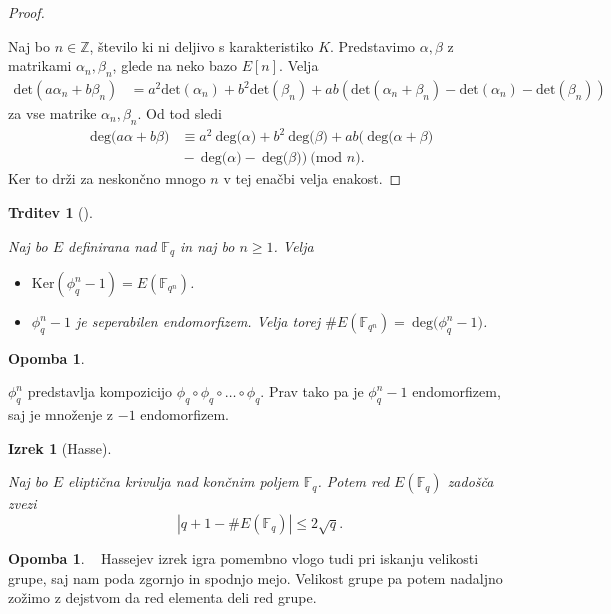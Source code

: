 \documentclass[12pt,a4paper,twoside]{article}
\theoremstyle{definition} %
\newtheorem{opomba}[definicija]{Opomba}
\theoremstyle{plain} %
\newtheorem{izrek}[definicija]{Izrek}
\newtheorem{trditev}[definicija]{Trditev}
\numberwithin{equation}{section}  %
\newcommand{\Z}{\mathbb Z}
\newcommand{\F}{\mathbb F}
\newcommand{\E}[1]{E({#1})}
\newcommand{\MOD}[1]{\ \text{(mod }{#1}\text{)}}
\newcommand{\DEG}[1]{\ \text{deg(}{#1}\text{)}}
\begin{document}
\begin{proof}~

Naj bo $n \in \Z$, število ki ni deljivo s karakteristiko $K$. Predstavimo $\alpha,\beta$ z matrikami $\alpha_n,\beta_n$, glede na neko bazo $E[n]$.
Velja
\begin{align}
\text{det}(a\alpha_n+b\beta_n) &{}=  a^2\text{det}(\alpha_n)+b^2\text{det}(\beta_n) + ab(\text{det}(\alpha_n+\beta_n)-\text{det}(\alpha_n)-\text{det}(\beta_n)) \nonumber
\end{align}
za vse matrike $\alpha_n,\beta_n$.
Od tod sledi
\begin{align}
\DEG{a\alpha+b\beta} &{}\equiv a^2\DEG{\alpha}+b^2\DEG{\beta} + ab(\DEG{\alpha+\beta} \nonumber \\
&{}-\DEG{\alpha}-\DEG{\beta}) \MOD{n}. \nonumber
\end{align}
Ker to drži za neskončno mnogo $n$ v tej enačbi velja enakost.


\end{proof}

\begin{trditev}[]~

\label{trd:4.7}
Naj bo $E$ definirana nad $\F_q$ in naj bo $n \geq 1$. Velja
\begin{itemize}
\item $\text{Ker}(\phi^n_q-1) = \E{\F_{q^n}}$.
\item $\phi^n_q-1$ je seperabilen endomorfizem. Velja torej $\#\E{\F_{q^n}} = \DEG{\phi^n_q-1}$.
\end{itemize}
\end{trditev}

\begin{opomba}~

$\phi^n_q$ predstavlja kompozicijo $\phi_q \circ \phi_q \circ \ldots \circ \phi_q$. Prav tako pa je $\phi^n_q-1$ endomorfizem, saj je množenje z $-1$ endomorfizem.
\end{opomba}

\begin{izrek}[Hasse]~

\label{izr:Hasse}
Naj bo $E$ eliptična krivulja nad končnim poljem $\F_q$.  Potem red $\E{\F_q}$ zadošča zvezi
$$|q+1-\#\E{\F_q}| \leq 2\sqrt{q}.$$
\end{izrek}

\begin{opomba}~
Hassejev izrek igra pomembno vlogo tudi pri iskanju velikosti grupe, saj nam poda zgornjo in spodnjo mejo. Velikost grupe pa potem nadaljno zožimo z dejstvom da red elementa deli red grupe. 
\end{opomba}
\end{document}
